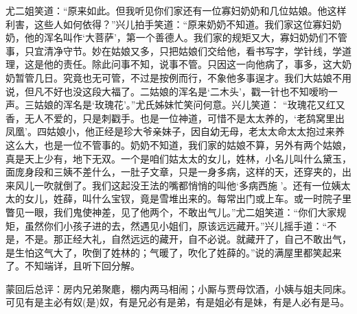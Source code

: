 \begin{parag}
    尤二姐笑道：“原来如此。但我听见你们家还有一位寡妇奶奶和几位姑娘。他这样利害，这些人如何依得？”兴儿拍手笑道：“原来奶奶不知道。我们家这位寡妇奶奶，他的浑名叫作‘大菩萨’，第一个善德人。我们家的规矩又大，寡妇奶奶们不管事，只宜清净守节。妙在姑娘又多，只把姑娘们交给他，看书写字，学针线，学道理，这是他的责任。除此问事不知，说事不管。只因这一向他病了，事多，这大奶奶暂管几日。究竟也无可管，不过是按例而行，不象他多事逞才。我们大姑娘不用说，但凡不好也没这段大福了。二姑娘的浑名是‘二木头’，戳一针也不知嗳哟一声。三姑娘的浑名是‘玫瑰花’。”尤氏姊妹忙笑问何意。兴儿笑道： “玫瑰花又红又香，无人不爱的，只是刺戳手。也是一位神道，可惜不是太太养的，‘老鸹窝里出凤凰’。四姑娘小，他正经是珍大爷亲妹子，因自幼无母，老太太命太太抱过来养这么大，也是一位不管事的。奶奶不知道，我们家的姑娘不算，另外有两个姑娘，真是天上少有，地下无双。一个是咱们姑太太的女儿，姓林，小名儿叫什么黛玉，面庞身段和三姨不差什么，一肚子文章，只是一身多病，这样的天，还穿夹的，出来风儿一吹就倒了。我们这起没王法的嘴都悄悄的叫他‘多病西施 ’。还有一位姨太太的女儿，姓薛，叫什么宝钗，竟是雪堆出来的。每常出门或上车。或一时院子里瞥见一眼，我们鬼使神差，见了他两个，不敢出气儿。”尤二姐笑道：“你们大家规矩，虽然你们小孩子进的去，然遇见小姐们，原该远远藏开。”兴儿摇手道：“不是，不是。那正经大礼，自然远远的藏开，自不必说。就藏开了，自己不敢出气，是生怕这气大了，吹倒了姓林的；气暖了，吹化了姓薛的。”说的满屋里都笑起来了。不知端详，且听下回分解。
\end{parag}


\begin{parag}
    \begin{note}蒙回后总评：房内兄弟聚麀，棚内两马相闹；小厮与贾母饮酒，小姨与姐夫同床。可见有是主必有奴(是)奴，有是兄必有是弟，有是姐必有是妹，有是人必有是马。\end{note}
\end{parag}
